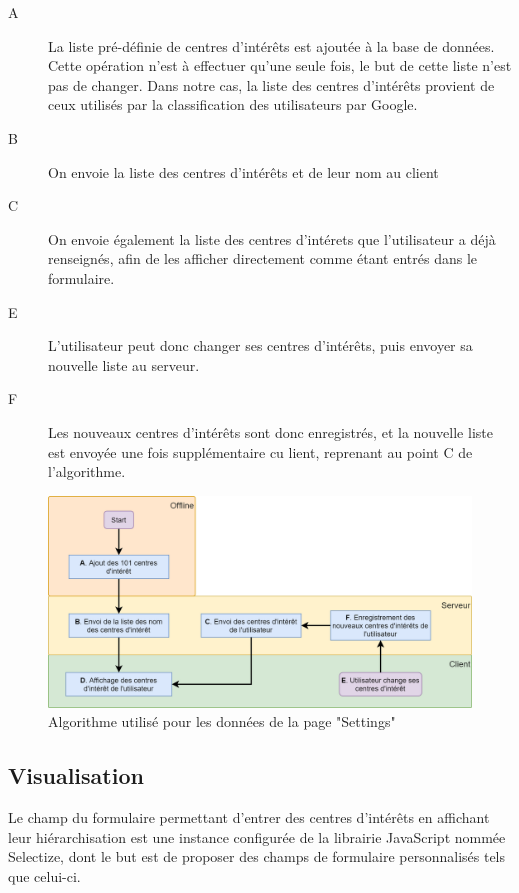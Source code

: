 		\begin{description}
			\item[A] La liste pré-définie de centres d'intérêts est ajoutée à la base de données. Cette opération n'est à effectuer qu'une seule fois, le but de cette liste n'est pas de changer. Dans notre cas, la liste des centres d'intérêts provient de ceux utilisés par la classification des utilisateurs par Google.

			\item[B] On envoie la liste des centres d'intérêts et de leur nom au client

			\item[C] On envoie également la liste des centres d'intérets que l'utilisateur a déjà renseignés, afin de les afficher directement comme étant entrés dans le formulaire.

			\item[E] L'utilisateur peut donc changer ses centres d'intérêts, puis envoyer sa nouvelle liste au serveur.

			\item[F] Les nouveaux centres d'intérêts sont donc enregistrés, et la nouvelle liste est envoyée une fois supplémentaire cu lient, reprenant au point C de l'algorithme.

		\end{description}

		\begin{figure}[!h]
			\centering
			\includegraphics[height=0.55\textwidth]{images/design/pages/settings_algo}
			\caption{Algorithme utilisé pour les données de la page "Settings"}
			\label{settings_algo}
		\end{figure}

	\subsection{Visualisation}

		Le champ du formulaire permettant d'entrer des centres d'intérêts en affichant leur hiérarchisation est une instance configurée de la librairie JavaScript nommée Selectize\cite{selectize}, dont le but est de proposer des champs de formulaire personnalisés tels que celui-ci.

\clearpage